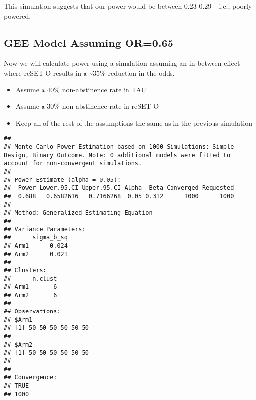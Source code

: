 \documentclass[
]{article}
\newenvironment{Shaded}{\begin{snugshade}}{\end{snugshade}}
\newcommand{\CommentTok}[1]{\textcolor[rgb]{0.56,0.35,0.01}{\textit{#1}}}
\newcommand{\KeywordTok}[1]{\textcolor[rgb]{0.13,0.29,0.53}{\textbf{#1}}}
\newcommand{\NormalTok}[1]{#1}
\newcommand{\StringTok}[1]{\textcolor[rgb]{0.31,0.60,0.02}{#1}}
\providecommand{\tightlist}{%
  \setlength{\itemsep}{0pt}\setlength{\parskip}{0pt}}
\begin{document}
This simulation suggests that our power would be between 0.23-0.29 --
i.e., poorly powered.

\hypertarget{gee-model-assuming-or0.65}{%
\subsection{GEE Model Assuming
OR=0.65}\label{gee-model-assuming-or0.65}}

Now we will calculate power using a simulation assuming an in-between
effect where reSET-O results in a \textasciitilde35\% reduction in the
odds.

\begin{itemize}
\tightlist
\item
  Assume a 40\% non-abstinence rate in TAU
\item
  Assume a 30\% non-abstinence rate in reSET-O
\item
  Keep all of the rest of the assumptions the same as in the previous
  simulation
\end{itemize}

\begin{Shaded}
\end{Shaded}

\begin{verbatim}
## 
## Monte Carlo Power Estimation based on 1000 Simulations: Simple Design, Binary Outcome. Note: 0 additional models were fitted to account for non-convergent simulations.
## 
## Power Estimate (alpha = 0.05):
##  Power Lower.95.CI Upper.95.CI Alpha  Beta Converged Requested
##  0.688   0.6582616   0.7166268  0.05 0.312      1000      1000
## 
## Method: Generalized Estimating Equation 
## 
## Variance Parameters:
##      sigma_b_sq
## Arm1      0.024
## Arm2      0.021
## 
## Clusters:
##      n.clust
## Arm1       6
## Arm2       6
## 
## Observations:
## $Arm1
## [1] 50 50 50 50 50 50
## 
## $Arm2
## [1] 50 50 50 50 50 50
## 
## 
## Convergence:
## TRUE 
## 1000
\end{verbatim}
\end{document}
